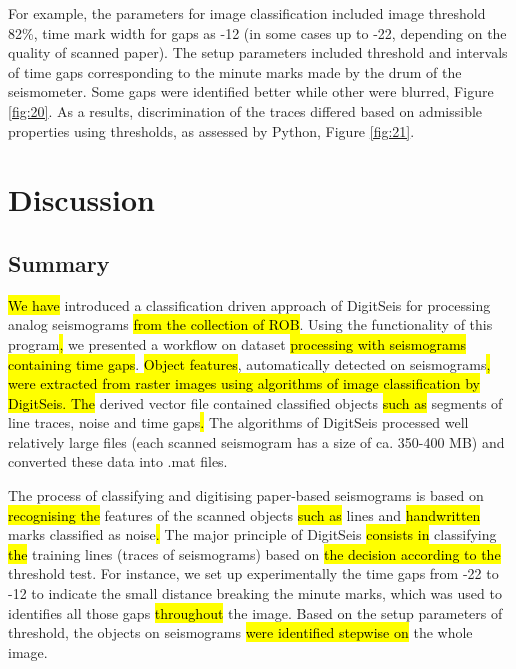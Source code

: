 \documentclass[sensors,article,submit,moreauthors,pdftex]{Definitions/mdpi}
\begin{document}
For example, the parameters for image classification included image threshold 82\%, time mark width for gaps as -12 (in some cases up to -22, depending on the quality of scanned paper). The setup parameters included threshold and intervals of time gaps corresponding to the minute marks made by the drum of the seismometer. Some gaps were identified better while other were blurred, Figure \ref{fig:20}. As a results, discrimination of the traces differed based on admissible properties using thresholds, as assessed by Python, Figure \ref{fig:21}. 

\section{Discussion}

\subsection{Summary}
\hl{We have }introduced a classification driven approach of DigitSeis for processing analog seismograms \hl{from the collection of ROB}. Using the functionality of this program\hl{, }we presented a workflow\hl{ }on dataset\hl{ processing with seismograms containing time gaps}. \hl{Object features}, automatically detected on seismograms\hl{, were extracted from raster images using algorithms of image classification by DigitSeis. The }derived\hl{ }vector file contained\hl{ }classified objects \hl{such as }segments of line traces, noise and time gaps\hl{. }The algorithms of DigitSeis processed well relatively large files (each scanned seismogram has a size of ca. 350-400 MB) and converted these data into .mat files. 

The process of classifying and digitising paper-based seismograms is based on \hl{recognising the }features of the scanned objects \hl{such as }lines and\hl{ handwritten }marks\hl{ }classified as noise\hl{. }The major principle of DigitSeis \hl{consists in }classifying \hl{the }training lines (traces of seismograms) based on \hl{the decision according to the }threshold test. For instance, we set up experimentally the time gaps from -22 to -12 to indicate the small distance breaking the minute marks, which was used\hl{ }to identifies all those gaps \hl{throughout }the image. Based on the setup parameters of threshold, the\hl{ }objects on seismograms \hl{were identified stepwise on }the whole image.
\end{document}
